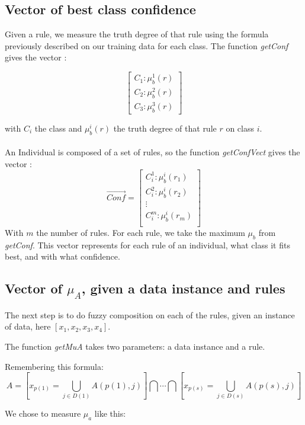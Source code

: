 \documentclass[a4paper,12pt]{article}
\begin{document}
\subsection{Vector of best class confidence}

Given a rule, we measure the truth degree of that rule using the formula previously described on our training data for each class.
The function \textit{getConf} gives the vector :

\[
\begin{bmatrix}
C_1:\mu_b^1(r)\\
C_2:\mu_b^2(r)\\
C_3:\mu_b^3(r)
\end{bmatrix} \]

with $C_i$ the class and $\mu_b^i(r)$ the truth degree of that rule $r$ on class $i$.
\\
\\
An Individual is composed of a set of rules, so the function \textit{getConfVect} gives the vector :
\[
\vec{Conf}=
\begin{bmatrix}
C_i^1:\mu_b^i(r_1)\\
C_i^2:\mu_b^i(r_2)\\
\vdots\\
C_i^m:\mu_b^i(r_m)\\
\end{bmatrix} \]
With $m$ the number of rules. For each rule, we take the maximum $\mu_b$ from \textit{getConf}. This vector represents for each rule of an individual, what class it fits best, and with what confidence.

\subsection{Vector of $\mu_A$, given a data instance and rules}

The next step is to do fuzzy composition on each of the rules, given an instance of data, here $[x_1,x_2,x_3,x_4]$.

The function \textit{getMuA} takes two parameters: a data instance and a rule.

Remembering this formula:
\[A=[x_{p(1)}=\bigcup_{j\in D(1)}A(p(1),j) ] \bigcap\cdots\bigcap[x_{p(s)}=\bigcup_{j\in D(s)}A(p(s),j)]\]

We chose to measure $\mu_a$ like this:
\end{document}
